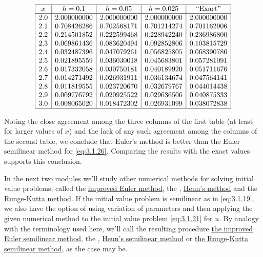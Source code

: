 \documentclass{ximera}
\begin{document}
\begin{example}{\color{blue}}
$$
\begin{array}{|c|c|c|c|c|}
\hline
x&
h=0.1&
h=0.05&
h=0.025&
\text{``Exact''} \\ \hline
2.0 &2.000000000 & 2.000000000 & 2.000000000 & 2.000000000 \\
2.1 &0.708426286 & 0.702568171 & 0.701214274 & 0.701162906 \\
2.2 &0.214501852 & 0.222599468 & 0.228942240 & 0.236986800 \\
2.3 &0.069861436 & 0.083620494 & 0.092852806 & 0.103815729 \\
2.4 &0.032487396 & 0.047079261 & 0.056825805 & 0.068390786 \\
2.5 &0.021895559 & 0.036030018 & 0.045683801 & 0.057281091 \\
2.6 &0.017332058 & 0.030750181 & 0.040189920 & 0.051711676 \\
2.7 &0.014271492 & 0.026931911 & 0.036134674 & 0.047564141 \\
2.8 &0.011819555 & 0.023720670 & 0.032679767 & 0.044014438 \\
2.9 &0.009776792 & 0.020925522 & 0.029636506 & 0.040875333 \\
3.0 &0.008065020 & 0.018472302 & 0.026931099 & 0.038072838 \\
\hline
\end{array}
$$


Noting the close
agreement among the  three columns of the first table (at
least for larger values of $x$) and the lack of any such agreement
among the columns of the second table, we conclude that
Euler's method is better than the Euler semilinear method for
\eqref{eq:3.1.26}. Comparing the results with the exact values
supports this conclusion.
\end{example}

In the next two modules we'll study other numerical methods for
solving initial value problems,  called the
\href{http://www-history.mcs.st-and.ac.uk/Mathematicians/Euler.html}{improved Euler method}, the ,
\href{http://www-history.mcs.st-and.ac.uk/Mathematicians/Heun.html}{Heun's method}
and the
\href{http://www-history.mcs.st-and.ac.uk/Mathematicians/Runge.html}{Runge}-\href{http://www-history.mcs.st-and.ac.uk/Mathematicians/Kutta.html}{Kutta method}.
 If the initial value problem is semilinear as
in \eqref{eq:3.1.19},  we also have the option of using variation of
parameters and then applying the given numerical method to the initial
value problem \eqref{eq:3.1.21} for $u$. By analogy with the terminology
used here, we'll call the resulting procedure
\href{http://www-history.mcs.st-and.ac.uk/Mathematicians/Euler.html}{the improved Euler semilinear method}, the ,
\href{http://www-history.mcs.st-and.ac.uk/Mathematicians/Heun.html}{Heun's semilinear method} or
\href{http://www-history.mcs.st-and.ac.uk/Mathematicians/Runge.html}{the Runge}-\href{http://www-history.mcs.st-and.ac.uk/Mathematicians/Kutta.html}{Kutta semilinear method}, as
the case may be.
\end{document}

